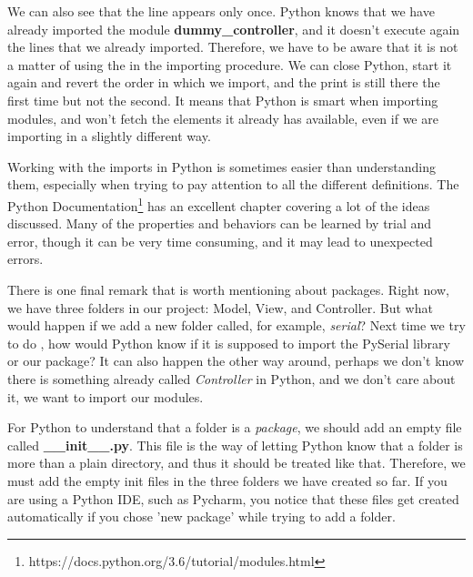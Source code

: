 \sloppy We can also see that the line  appears only once. Python knows that we have already imported the module \textbf{dummy\_controller}, and it doesn't execute again the lines that we already imported. Therefore, we have to be aware that it is not a matter of using the  in the importing procedure. We can close Python, start it again and revert the order in which we import, and the print is still there the first time but not the second. It means that Python is smart when importing modules, and won't fetch the elements it already has available, even if we are importing in a slightly different way.


Working with the imports in Python is sometimes easier than understanding them, especially when trying to pay attention to all the different definitions. The Python Documentation\footnote{https://docs.python.org/3.6/tutorial/modules.html} has an excellent chapter covering a lot of the ideas discussed. Many of the properties and behaviors can be learned by trial and error, though it can be very time consuming, and it may lead to unexpected errors.

There is one final remark that is worth mentioning about packages. Right now, we have three folders in our project: Model, View, and Controller. But what would happen if we add a new folder called, for example, \emph{serial}? Next time we try to do , how would Python know if it is supposed to import the PySerial library or our package? It can also happen the other way around, perhaps we don't know there is something already called \emph{Controller} in Python, and we don't care about it, we want to import our modules.

For Python to understand that a folder is a \emph{package}, we should add an empty file called \textbf{\_\_init\_\_.py}. This file is the way of letting Python know that a folder is more than a plain directory, and thus it should be treated like that. Therefore, we must add the empty init files in the three folders we have created so far. If you are using a Python IDE, such as Pycharm, you notice that these files get created automatically if you chose 'new package' while trying to add a folder.

